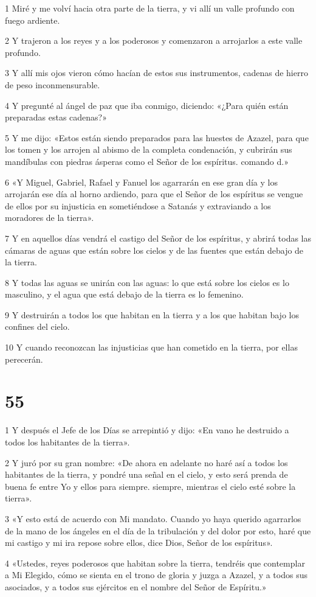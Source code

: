 \par 1 Miré y me volví hacia otra parte de la tierra, y vi allí un valle profundo con fuego ardiente.
\par 2 Y trajeron a los reyes y a los poderosos y comenzaron a arrojarlos a este valle profundo.
\par 3 Y allí mis ojos vieron cómo hacían de estos sus instrumentos, cadenas de hierro de peso inconmensurable.
\par 4 Y pregunté al ángel de paz que iba conmigo, diciendo: «¿Para quién están preparadas estas cadenas?»
\par 5 Y me dijo: «Estos están siendo preparados para las huestes de Azazel, para que los tomen y los arrojen al abismo de la completa condenación, y cubrirán sus mandíbulas con piedras ásperas como el Señor de los espíritus. comando d.»
\par 6 «Y Miguel, Gabriel, Rafael y Fanuel los agarrarán en ese gran día y los arrojarán ese día al horno ardiendo, para que el Señor de los espíritus se vengue de ellos por su injusticia en sometiéndose a Satanás y extraviando a los moradores de la tierra».
\par 7 Y en aquellos días vendrá el castigo del Señor de los espíritus, y abrirá todas las cámaras de aguas que están sobre los cielos y de las fuentes que están debajo de la tierra.
\par 8 Y todas las aguas se unirán con las aguas: lo que está sobre los cielos es lo masculino, y el agua que está debajo de la tierra es lo femenino.
\par 9 Y destruirán a todos los que habitan en la tierra y a los que habitan bajo los confines del cielo.
\par 10 Y cuando reconozcan las injusticias que han cometido en la tierra, por ellas perecerán.

\chapter{55}

\par 1 Y después el Jefe de los Días se arrepintió y dijo: «En vano he destruido a todos los habitantes de la tierra».
\par 2 Y juró por su gran nombre: «De ahora en adelante no haré así a todos los habitantes de la tierra, y pondré una señal en el cielo, y esto será prenda de buena fe entre Yo y ellos para siempre. siempre, mientras el cielo esté sobre la tierra».
\par 3 «Y esto está de acuerdo con Mi mandato. Cuando yo haya querido agarrarlos de la mano de los ángeles en el día de la tribulación y del dolor por esto, haré que mi castigo y mi ira repose sobre ellos, dice Dios, Señor de los espíritus».
\par 4 «Ustedes, reyes poderosos que habitan sobre la tierra, tendréis que contemplar a Mi Elegido, cómo se sienta en el trono de gloria y juzga a Azazel, y a todos sus asociados, y a todos sus ejércitos en el nombre del Señor de Espíritu.»

